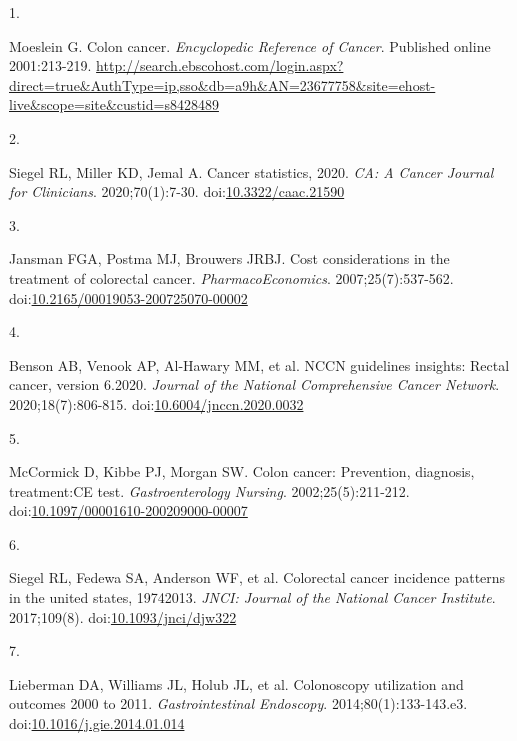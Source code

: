 \documentclass[11pt]{umnthesis}
\newlength{\csllabelwidth}
\newlength{\cslhangindent}
\newenvironment{CSLReferences}[2] %
 {%
  \setlength{\parindent}{0pt}
  \ifodd #1 \everypar{\setlength{\hangindent}{\cslhangindent}}\ignorespaces\fi
  \ifnum #2 > 0
  \setlength{\parskip}{#2\baselineskip}
  \fi
 }%
 {}
\newcommand{\CSLLeftMargin}[1]{\parbox[t]{\csllabelwidth}{#1}}
\newcommand{\CSLRightInline}[1]{\parbox[t]{\linewidth - \csllabelwidth}{#1}}
\begin{document}
\hypertarget{refs}{}
\begin{CSLReferences}{0}{0}
\leavevmode{}%
\CSLLeftMargin{1. }
\CSLRightInline{Moeslein G. Colon cancer. \emph{Encyclopedic Reference of Cancer}. Published online 2001:213-219. \url{http://search.ebscohost.com/login.aspx?direct=true\&AuthType=ip,sso\&db=a9h\&AN=23677758\&site=ehost-live\&scope=site\&custid=s8428489}}

\leavevmode{}%
\CSLLeftMargin{2. }
\CSLRightInline{Siegel RL, Miller KD, Jemal A. Cancer statistics, 2020. \emph{{CA}: A Cancer Journal for Clinicians}. 2020;70(1):7-30. doi:\href{https://doi.org/10.3322/caac.21590}{10.3322/caac.21590}}

\leavevmode{}%
\CSLLeftMargin{3. }
\CSLRightInline{Jansman FGA, Postma MJ, Brouwers JRBJ. Cost considerations in the treatment of colorectal cancer. \emph{{PharmacoEconomics}}. 2007;25(7):537-562. doi:\href{https://doi.org/10.2165/00019053-200725070-00002}{10.2165/00019053-200725070-00002}}

\leavevmode{}%
\CSLLeftMargin{4. }
\CSLRightInline{Benson AB, Venook AP, Al-Hawary MM, et al. {NCCN} guidelines insights: Rectal cancer, version 6.2020. \emph{Journal of the National Comprehensive Cancer Network}. 2020;18(7):806-815. doi:\href{https://doi.org/10.6004/jnccn.2020.0032}{10.6004/jnccn.2020.0032}}

\leavevmode{}%
\CSLLeftMargin{5. }
\CSLRightInline{McCormick D, Kibbe PJ, Morgan SW. Colon cancer: Prevention, diagnosis, treatment:{CE} test. \emph{Gastroenterology Nursing}. 2002;25(5):211-212. doi:\href{https://doi.org/10.1097/00001610-200209000-00007}{10.1097/00001610-200209000-00007}}

\leavevmode{}%
\CSLLeftMargin{6. }
\CSLRightInline{Siegel RL, Fedewa SA, Anderson WF, et al. Colorectal cancer incidence patterns in the united states, 1974{\textendash}2013. \emph{{JNCI}: Journal of the National Cancer Institute}. 2017;109(8). doi:\href{https://doi.org/10.1093/jnci/djw322}{10.1093/jnci/djw322}}

\leavevmode{}%
\CSLLeftMargin{7. }
\CSLRightInline{Lieberman DA, Williams JL, Holub JL, et al. Colonoscopy utilization and outcomes 2000 to 2011. \emph{Gastrointestinal Endoscopy}. 2014;80(1):133-143.e3. doi:\href{https://doi.org/10.1016/j.gie.2014.01.014}{10.1016/j.gie.2014.01.014}}


\end{CSLReferences}
\end{document}
